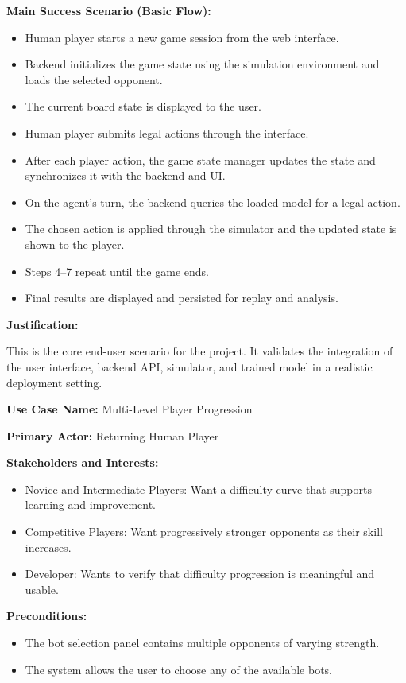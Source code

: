 \documentclass{article}
\begin{document}
\noindent\textbf{Main Success Scenario (Basic Flow):}
\begin{itemize}
    \item Human player starts a new game session from the web interface.
    \item Backend initializes the game state using the simulation environment and loads the selected opponent.
    \item The current board state is displayed to the user.
    \item Human player submits legal actions through the interface.
    \item After each player action, the game state manager updates the state and synchronizes it with the backend and UI.
    \item On the \RL{} agent's turn, the backend queries the loaded model for a legal action.
    \item The chosen action is applied through the simulator and the updated state is shown to the player.
    \item Steps 4--7 repeat until the game ends.
    \item Final results are displayed and persisted for replay and analysis.
\end{itemize}

\noindent\textbf{Justification:}

This is the core end-user scenario for the project. It validates the integration of the user interface, backend API, simulator, and trained model in a realistic deployment setting.

\vspace{1em}

\noindent\textbf{Use Case Name:} Multi-Level Player Progression

\noindent\textbf{Primary Actor:} Returning Human Player

\noindent\textbf{Stakeholders and Interests:}
\begin{itemize}
    \item Novice and Intermediate Players: Want a difficulty curve that supports learning and improvement.
    \item Competitive Players: Want progressively stronger opponents as their skill increases.
    \item Developer: Wants to verify that difficulty progression is meaningful and usable.
\end{itemize}

\noindent\textbf{Preconditions:}
\begin{itemize}
    \item The bot selection panel contains multiple opponents of varying strength.
    \item The system allows the user to choose any of the available bots.
\end{itemize}
\end{document}
